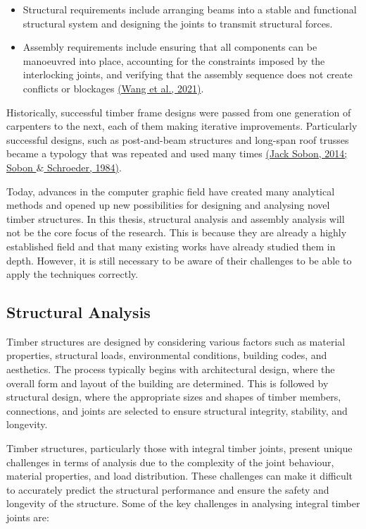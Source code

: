 \begin{itemize}
	\item Structural requirements include arranging beams into a stable and functional structural system and designing the joints to transmit structural forces. 

	\item Assembly requirements include ensuring that all components can be manoeuvred into place, accounting for the constraints imposed by the interlocking joints, and verifying that the assembly sequence does not create conflicts or blockages \href{https://www.zotero.org/google-docs/?81R5f7}{(Wang et al., 2021)}. 

\end{itemize}
Historically, successful timber frame designs were passed from one generation of carpenters to the next, each of them making iterative improvements. Particularly successful designs, such as post-and-beam structures and long-span roof trusses became a typology that was repeated and used many times \href{https://www.zotero.org/google-docs/?u1rNPf}{(Jack Sobon, 2014; Sobon $\&$ Schroeder, 1984)}.

Today, advances in the computer graphic field have created many analytical methods and opened up new possibilities for designing and analysing novel timber structures. In this thesis, structural analysis and assembly analysis will not be the core focus of the research. This is because they are already a highly established field and that many existing works have already studied them in depth. However, it is still necessary to be aware of their challenges to be able to apply the techniques correctly.

\subsection{Structural Analysis}

Timber structures are designed by considering various factors such as material properties, structural loads, environmental conditions, building codes, and aesthetics. The process typically begins with architectural design, where the overall form and layout of the building are determined. This is followed by structural design, where the appropriate sizes and shapes of timber members, connections, and joints are selected to ensure structural integrity, stability, and longevity.

Timber structures, particularly those with integral timber joints, present unique challenges in terms of analysis due to the complexity of the joint behaviour, material properties, and load distribution. These challenges can make it difficult to accurately predict the structural performance and ensure the safety and longevity of the structure. Some of the key challenges in analysing integral timber joints are:

